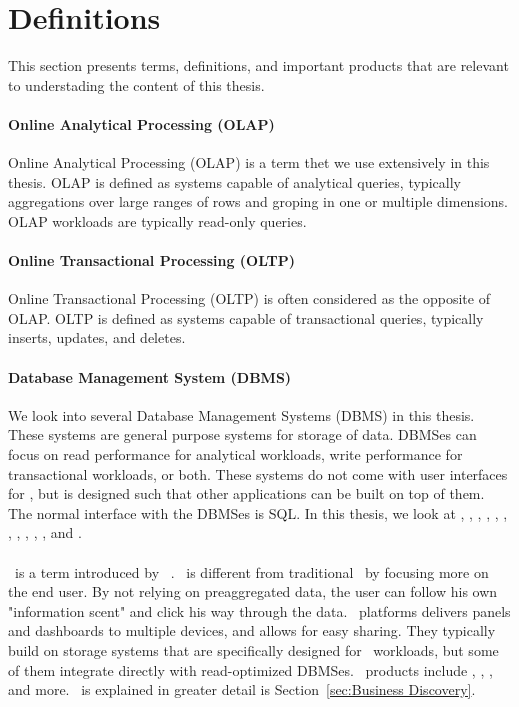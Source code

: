 \section{Definitions}
\label{sec:Definitions}
This section presents terms, definitions, and important products that are relevant to understading the content of this thesis.

\paragraph{Online Analytical Processing (OLAP)}
\label{par:Online Analytical Processing (OLAP)}
Online Analytical Processing (OLAP) is a term thet we use extensively in this thesis. OLAP is defined as systems capable of analytical queries, typically aggregations over large ranges of rows and groping in one or multiple dimensions. OLAP workloads are typically read-only queries.

\paragraph{Online Transactional Processing (OLTP)}
\label{par:Online Transactional Processing (OLTP)}
Online Transactional Processing (OLTP) is often considered as the opposite of OLAP. OLTP is defined as systems capable of transactional queries, typically inserts, updates, and deletes. 

\paragraph{Database Management System (DBMS)}
\label{par:Database Management System (DBMS)}
We look into several Database Management Systems (DBMS) in this thesis. These systems are general purpose systems for storage of data. DBMSes can focus on read performance for analytical workloads, write performance for transactional workloads, or both. These systems do not come with user interfaces for \bd, but is designed such that other applications can be built on top of them. The normal interface with the DBMSes is SQL. In this thesis, we look at \oracle, \ibm, \saph, \sapnw, \mssql, \cstore, \vertica, \blink, \exasol, \oracle, \hyper, and \hyrise.

\paragraph{\bd}
\label{par:Business Discovery}
\bd~is a term introduced by \qlikview~\cite{Qlik2014-vd}. \bd~is different from traditional \bi~by focusing more on the end user. By not relying on preaggregated data, the user can follow his own "information scent" and click his way through the data. \bd~platforms delivers panels and dashboards to multiple devices, and allows for easy sharing. They typically build on storage systems that are specifically designed for \bd~workloads, but some of them integrate directly with read-optimized DBMSes. \bd~products include \tableau, \qlikview, \powerpivot, and more. \bd~is explained in greater detail is Section~\ref{sec:Business Discovery}.

